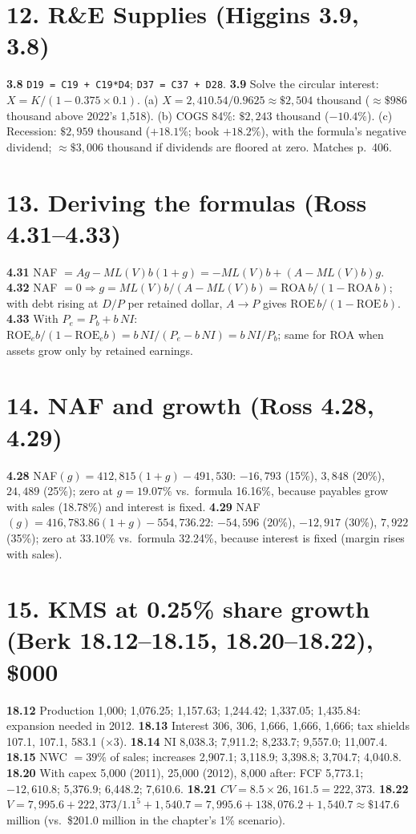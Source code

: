 \documentclass[11pt,a4paper]{article}
\begin{document}
\section*{12. R\&E Supplies (Higgins 3.9, 3.8)}
\textbf{3.8} \texttt{D19 = C19 + C19*D4}; \texttt{D37 = C37 + D28}. \textbf{3.9} Solve the circular interest:
$X=K/(1-0.375\times0.1)$. (a) $X=2{,}410.54/0.9625\approx\$2{,}504$ thousand ($\approx\$986$ thousand above
2022's 1,518). (b) COGS 84\%: $\$2{,}243$ thousand ($-10.4\%$). (c) Recession: $\$2{,}959$ thousand
($+18.1\%$; book $+18.2\%$), with the formula's negative dividend; $\approx\$3{,}006$ thousand if dividends are
floored at zero. Matches p.~406.

\section*{13. Deriving the formulas (Ross 4.31--4.33)}
\textbf{4.31} NAF $=Ag-ML(V)b(1+g)=-ML(V)b+(A-ML(V)b)g$. \textbf{4.32} NAF $=0\Rightarrow g=ML(V)b/(A-ML(V)b)=
\text{ROA}\,b/(1-\text{ROA}\,b)$; with debt rising at $D/P$ per retained dollar, $A\to P$ gives
$\text{ROE}\,b/(1-\text{ROE}\,b)$. \textbf{4.33} With $P_e=P_b+b\,NI$:
$\text{ROE}_e b/(1-\text{ROE}_e b)=b\,NI/(P_e-b\,NI)=b\,NI/P_b$; same for ROA when assets grow only by retained earnings.

\section*{14. NAF and growth (Ross 4.28, 4.29)}
\textbf{4.28} NAF$(g)=412{,}815(1+g)-491{,}530$: $-16{,}793$ (15\%), $3{,}848$ (20\%), $24{,}489$ (25\%); zero at
$g=19.07\%$ vs.\ formula 16.16\%, because payables grow with sales (18.78\%) and interest is fixed.
\textbf{4.29} NAF$(g)=416{,}783.86(1+g)-554{,}736.22$: $-54{,}596$ (20\%), $-12{,}917$ (30\%), $7{,}922$ (35\%);
zero at $33.10\%$ vs.\ formula 32.24\%, because interest is fixed (margin rises with sales).

\section*{15. KMS at 0.25\% share growth (Berk 18.12--18.15, 18.20--18.22), \$000}
\textbf{18.12} Production 1,000; 1,076.25; 1,157.63; 1,244.42; 1,337.05; 1,435.84: expansion needed in 2012.
\textbf{18.13} Interest 306, 306, 1,666, 1,666, 1,666; tax shields 107.1, 107.1, 583.1 ($\times3$).
\textbf{18.14} NI 8,038.3; 7,911.2; 8,233.7; 9,557.0; 11,007.4. \textbf{18.15} NWC $=39\%$ of sales; increases
2,907.1; 3,118.9; 3,398.8; 3,704.7; 4,040.8. \textbf{18.20} With capex 5,000 (2011), 25,000 (2012), 8,000 after:
FCF 5,773.1; $-12{,}610.8$; 5,376.9; 6,448.2; 7,610.6. \textbf{18.21} $CV=8.5\times26{,}161.5=222{,}373$.
\textbf{18.22} $V=7{,}995.6+222{,}373/1.1^5+1{,}540.7=7{,}995.6+138{,}076.2+1{,}540.7\approx\$147.6$ million
(vs.\ \$201.0 million in the chapter's 1\% scenario).
\end{document}
